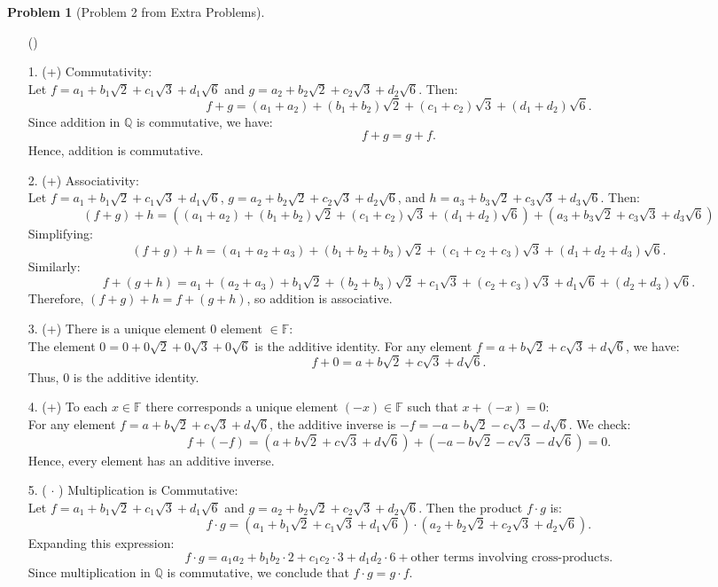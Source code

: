 \documentclass[12pt]{article}
\theoremstyle{definition}
\newtheorem{problem}{Problem}
\newcounter{subq}[problem]
\newenvironment{subproblem}
{\refstepcounter{subq} \begin{itemize} \item[(\alph{subq})]}
{\end{itemize} \medskip}
\begin{document}
\begin{problem}[Problem 2 from Extra Problems]
\begin{subproblem}
\begin{solution}
        1. (+) Commutativity:\\ 
        Let \( f = a_1 + b_1 \sqrt{2} + c_1 \sqrt{3} + d_1 \sqrt{6} \) and \( g = a_2 + b_2 \sqrt{2} + c_2 \sqrt{3} + d_2 \sqrt{6} \). Then:
        \[
        f + g = (a_1 + a_2) + (b_1 + b_2) \sqrt{2} + (c_1 + c_2) \sqrt{3} + (d_1 + d_2) \sqrt{6}.
        \]
        Since addition in \( \mathbb{Q} \) is commutative, we have:
        \[
        f + g = g + f.
        \]
        Hence, addition is commutative.

        2. (+) Associativity:\\ 
        Let \( f = a_1 + b_1 \sqrt{2} + c_1 \sqrt{3} + d_1 \sqrt{6} \), \( g = a_2 + b_2 \sqrt{2} + c_2 \sqrt{3} + d_2 \sqrt{6} \), and \( h = a_3 + b_3 \sqrt{2} + c_3 \sqrt{3} + d_3 \sqrt{6} \). Then:
        \[
        (f + g) + h = \left( (a_1 + a_2) + (b_1 + b_2) \sqrt{2} + (c_1 + c_2) \sqrt{3} + (d_1 + d_2) \sqrt{6} \right) + (a_3 + b_3 \sqrt{2} + c_3 \sqrt{3} + d_3 \sqrt{6})
        \]
        Simplifying:
        \[
        (f + g) + h = (a_1 + a_2 + a_3) + (b_1 + b_2 + b_3) \sqrt{2} + (c_1 + c_2 + c_3) \sqrt{3} + (d_1 + d_2 + d_3) \sqrt{6}.
        \]
        Similarly:
        \[
        f + (g + h) = a_1 + (a_2 + a_3) + b_1 \sqrt{2} + (b_2 + b_3) \sqrt{2} + c_1 \sqrt{3} + (c_2 + c_3) \sqrt{3} + d_1 \sqrt{6} + (d_2 + d_3) \sqrt{6}.
        \]
        Therefore, \( (f + g) + h = f + (g + h) \), so addition is associative.

        3. (+) There is a unique element $0$ element $\in \mathbb{F}$:\\
        The element \( 0 = 0 + 0 \sqrt{2} + 0 \sqrt{3} + 0 \sqrt{6} \) is the additive identity. For any element \( f = a + b \sqrt{2} + c \sqrt{3} + d \sqrt{6} \), we have:
        \[
        f + 0 = a + b \sqrt{2} + c \sqrt{3} + d \sqrt{6}.
        \]
        Thus, \( 0 \) is the additive identity.

        4. (+) To each $x \in \mathbb{F}$ there corresponds a unique element $(-x) \in \mathbb{F}$ such that $x + (-x) = 0$:\\
        For any element \( f = a + b \sqrt{2} + c \sqrt{3} + d \sqrt{6} \), the additive inverse is \( -f = -a - b \sqrt{2} - c \sqrt{3} - d \sqrt{6} \). We check:
        \[
        f + (-f) = (a + b \sqrt{2} + c \sqrt{3} + d \sqrt{6}) + (-a - b \sqrt{2} - c \sqrt{3} - d \sqrt{6}) = 0.
        \]
        Hence, every element has an additive inverse.

        5. ( $\cdot$ ) Multiplication is Commutative:\\
        Let \( f = a_1 + b_1 \sqrt{2} + c_1 \sqrt{3} + d_1 \sqrt{6} \) and \( g = a_2 + b_2 \sqrt{2} + c_2 \sqrt{3} + d_2 \sqrt{6} \). Then the product \( f \cdot g \) is:
        \[
        f \cdot g = (a_1 + b_1 \sqrt{2} + c_1 \sqrt{3} + d_1 \sqrt{6}) \cdot (a_2 + b_2 \sqrt{2} + c_2 \sqrt{3} + d_2 \sqrt{6}).
        \]
        Expanding this expression:
        \[
        f \cdot g = a_1 a_2 + b_1 b_2 \cdot 2 + c_1 c_2 \cdot 3 + d_1 d_2 \cdot 6 + \text{other terms involving cross-products}.
        \]
        Since multiplication in \( \mathbb{Q} \) is commutative, we conclude that \( f \cdot g = g \cdot f \).


\end{solution}
\end{subproblem}
\end{problem}
\end{document}
